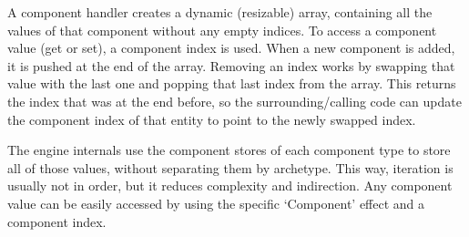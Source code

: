 A component handler creates a dynamic (resizable) array, containing all the values of that component without any empty indices. To access a component value (get or set), a component index is used. When a new component is added, it is pushed at the end of the array. Removing an index works by swapping that value with the last one and popping that last index from the array. This returns the index that was at the end before, so the surrounding/calling code can update the component index of that entity to point to the newly swapped index.

The engine internals use the component stores of each component type to store all of those values, without separating them by archetype. This way, iteration is usually not in order, but it reduces complexity and indirection. Any component value can be easily accessed by using the specific `Component' effect and a component index.

